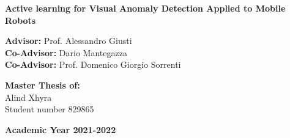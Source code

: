 \documentclass[a4paper,12pt]{report}
\begin{document}
\begin{titlepage}
	\vspace{15mm}
        
	\begin{center}
            {\LARGE{
                    \textbf{Active learning for Visual Anomaly Detection Applied to Mobile Robots}
                    \par
            }}
        \end{center}
        
        \vspace{20mm}

        \noindent
        {\large \textbf{Advisor:} Prof. Alessandro Giusti } \\

        \noindent
        {\large \textbf{Co-Advisor:} Dario Mantegazza} \\
        
        \noindent
        {\large \textbf{Co-Advisor:} Prof. Domenico Giorgio Sorrenti}
        
        \vspace{15mm}

        \begin{flushright}
            {\large \textbf{Master Thesis of:}} \\
            \large{Alind Xhyra} \\
            \large{Student number 829865} 
        \end{flushright}
        
        \vspace{30mm}
        \begin{center}
            {\large{\bf Academic Year 2021-2022}}
        \end{center}

        \restoregeometry
        
    \end{titlepage}
    
\end{document}
